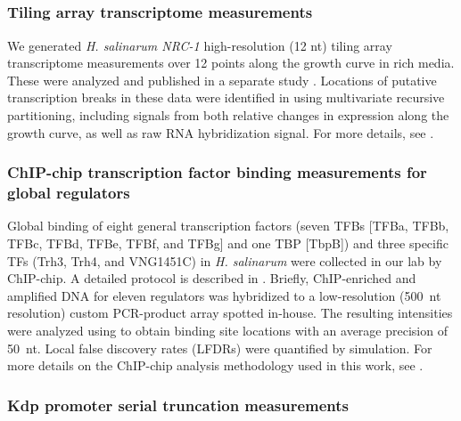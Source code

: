 
\textcolor{red}{}

\subsection{\halo}\label{halodata}

\subsubsection{Tiling array transcriptome measurements}

We generated {\it H. salinarum NRC-1} high-resolution (12 nt) tiling
array transcriptome measurements over 12 points along the growth curve
in rich media. These were analyzed and published in a separate study
\cite{Koide2009}. Locations of putative transcription breaks in these data were
identified in \cite{Koide2009} using multivariate recursive
partitioning, including signals from both relative changes in
expression along the growth curve, as well as raw RNA hybridization
signal. For more details, see \cite{Koide2009}.

\subsubsection{ChIP-chip transcription factor binding measurements for global regulators}

Global binding of eight general transcription factors (seven TFBs
[TFBa, TFBb, TFBc, TFBd, TFBe, TFBf, and TFBg] and one TBP [TbpB]) and
three specific TFs (Trh3, Trh4, and VNG1451C) in {\it H. salinarum}
were collected in our lab by ChIP-chip. A detailed protocol is described
in \cite{Facciotti2007}. Briefly, ChIP-enriched and amplified DNA for 
eleven regulators was hybridized to a low-resolution (500~nt resolution)
custom PCR-product array spotted in-house. The resulting intensities were
analyzed using {} \cite{Reiss2008} to obtain binding
site locations with an average precision of 50~nt. Local false discovery rates (LFDRs) were quantified by simulation. For more details
on the ChIP-chip analysis methodology used in this work, see \cite{Reiss2008}.

\subsubsection{Kdp promoter serial truncation measurements}

